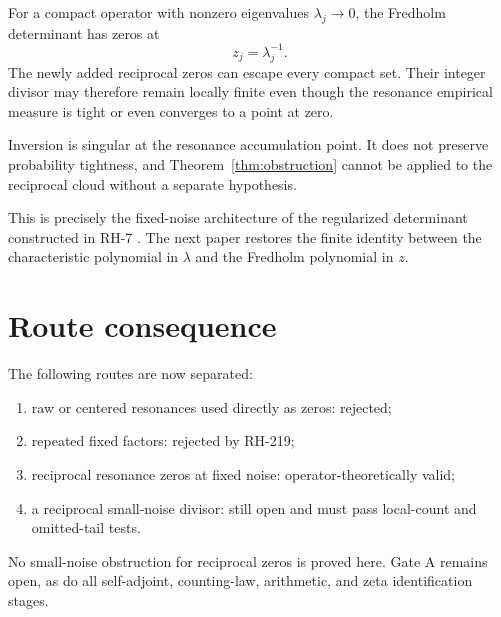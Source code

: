 \documentclass[11pt]{article}
\theoremstyle{remark}\newtheorem{remark}[theorem]{Remark}
\begin{document}
For a compact operator with nonzero eigenvalues $\lambda_j\to0$, the Fredholm
determinant has zeros at
\begin{equation}
 z_j=\lambda_j^{-1}.
\end{equation}
The newly added reciprocal zeros can escape every compact set. Their integer
divisor may therefore remain locally finite even though the resonance
empirical measure is tight or even converges to a point at zero.

Inversion is singular at the resonance accumulation point. It does not
preserve probability tightness, and Theorem~\ref{thm:obstruction} cannot be
applied to the reciprocal cloud without a separate hypothesis.

This is precisely the fixed-noise architecture of the regularized determinant
constructed in RH-7 \citep{WangRH7}. The next paper restores the finite
identity between the characteristic polynomial in $\lambda$ and the
Fredholm polynomial in $z$.

\section{Route consequence}

The following routes are now separated:
\begin{enumerate}[leftmargin=2em]
\item raw or centered resonances used directly as zeros: rejected;
\item repeated fixed factors: rejected by RH-219;
\item reciprocal resonance zeros at fixed noise: operator-theoretically valid;
\item a reciprocal small-noise divisor: still open and must pass local-count
and omitted-tail tests.
\end{enumerate}

No small-noise obstruction for reciprocal zeros is proved here. Gate A
remains open, as do all self-adjoint, counting-law, arithmetic, and zeta
identification stages.



\end{document}
